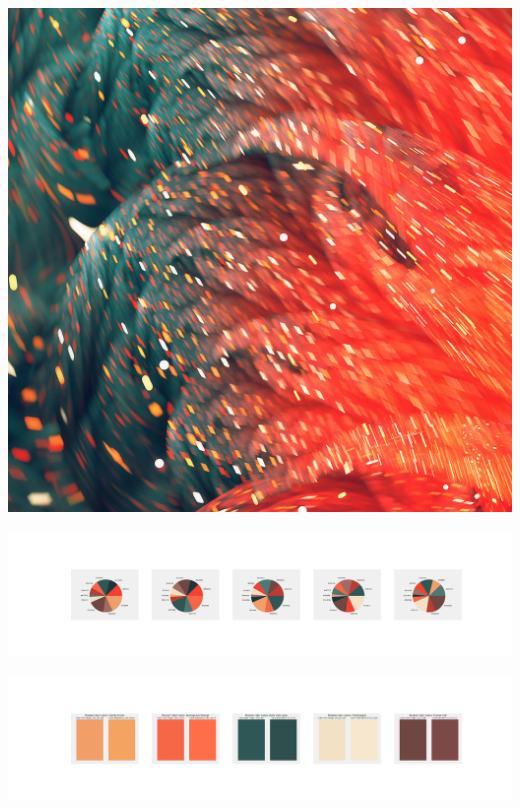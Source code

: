 \documentclass[11pt]{article}
\begin{document}
\begin{landscape}
    \begin{center}
    \includegraphics[width=\textwidth]{./nbimg/file (389).jpg}
    \end{center}

    \begin{center}
    \includegraphics[width=250mm]{./nbimg/pie-321.jpg}
    \end{center}

    \begin{center}
    \includegraphics[width=250mm]{./nbimg/peak-321.jpg}
    \end{center}
    


\end{landscape}
\end{document}
